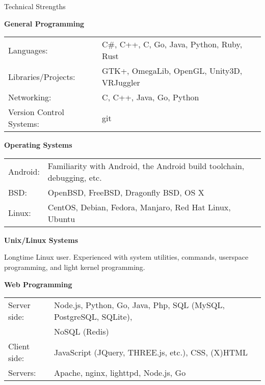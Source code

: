 \documentclass{resume} %
\newcommand{\btab}[2]{
	\bgroup
	\def\arraystretch{#1}
	\begin{tabular}{#2}
}
\newcommand{\etab}{
	\end{tabular} \smallskip
	\egroup
}
\begin{document}
\begin{rSection}{Technical Strengths}

{\bf General Programming}

\btab{1.1}{ l l }
	Languages: &  C\#, C++, C, Go, Java, Python, Ruby, Rust \\
	Libraries/Projects: & GTK+, OmegaLib, OpenGL, Unity3D, VRJuggler \\
	Networking: & C, C++, Java, Go, Python \\
	Version Control Systems: & git \\
\etab

{\bf Operating Systems}

\btab{1.1}{ l l }
	Android: & Familiarity with Android, the Android build toolchain, debugging, etc. \\
	BSD: & OpenBSD, FreeBSD, Dragonfly BSD, OS X \\
	Linux: & CentOS, Debian, Fedora, Manjaro, Red Hat Linux, Ubuntu \\
\etab

{\bf Unix/Linux Systems}

Longtime Linux user. Experienced with system utilities, commands, userspace programming, and light kernel programming.

{\bf Web Programming}

\btab{1.1}{ l l }
	Server side: & Node.js, Python, Go, Java, Php, SQL (MySQL, PostgreSQL, SQLite), \\
	& NoSQL (Redis) \\
	Client side: & JavaScript (JQuery, THREE.js, etc.), CSS, (X)HTML \\
	Servers: & Apache, nginx, lighttpd, Node.js, Go \\
\etab

\end{rSection}
\end{document}

